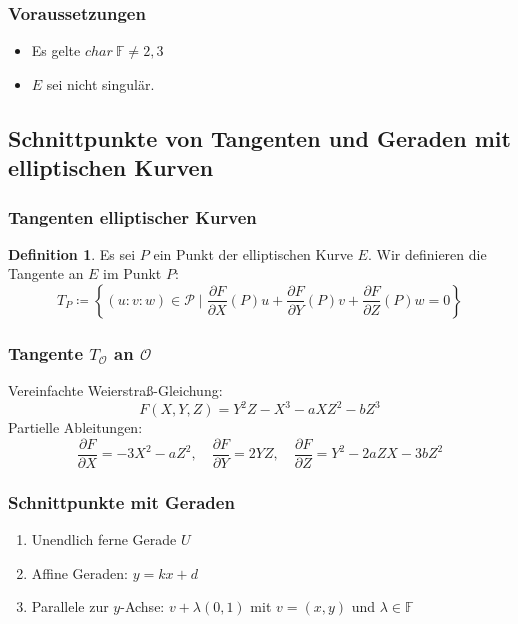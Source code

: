 \documentclass{beamer}
\theoremstyle{plain}
\theoremstyle{definition}
\newtheorem{defn}[thm]{Definition}
\theoremstyle{rem}
\newcommand{\patinf}{\mathcal{O}}
\begin{document}
\begin{frame}
\frametitle{Voraussetzungen}
\begin{itemize}
    \item Es gelte $char\ \mathbb{F}\ne2,3$
    \item $E$ sei nicht singulär.
\end{itemize}
\end{frame}

\subsection{Schnittpunkte von Tangenten und Geraden  mit elliptischen Kurven}

\begin{frame}
    \frametitle{Tangenten elliptischer Kurven}
    \begin{defn}
        Es sei $P$ ein Punkt der elliptischen Kurve $E$. Wir definieren die Tangente an $E$ im Punkt $P$:
        \begin{equation*}
            T_P\coloneqq\left\{(u:v:w)\in\mathcal{P}\mid\frac{\partial F}{\partial X}(P)u+\frac{\partial F}{\partial Y}(P)v+\frac{\partial F}{\partial Z}(P)w=0\right\}
        \end{equation*}
    \end{defn}
\end{frame}

\begin{frame}
	\frametitle{Tangente $T_{\mathcal{O}}$ an $\patinf$}
Vereinfachte Weierstraß-Gleichung:
    \begin{equation*}
	F(X,Y,Z)=Y^2Z - X^3 - aXZ^2 - bZ^3
    \end{equation*}
    Partielle Ableitungen:
\begin{equation*}
        \frac{\partial F}{\partial X}=-3X^2-aZ^2,\quad \frac{\partial F}{\partial Y}=2YZ,\quad \frac{\partial F}{\partial Z}=Y^2-2aZX-3bZ^2
    \end{equation*}
\end{frame}

\begin{frame}
    \frametitle{Schnittpunkte mit Geraden}
    \begin{enumerate}[<+(1)->]
        \item Unendlich ferne Gerade $U$
        \item Affine Geraden: $y = kx +d$
        \item Parallele zur $y$-Achse: $v + \lambda (0,1)$ mit $v=(x,y)$ und $\lambda \in \mathbb{F}$
    \end{enumerate}
\end{frame}
\end{document}
